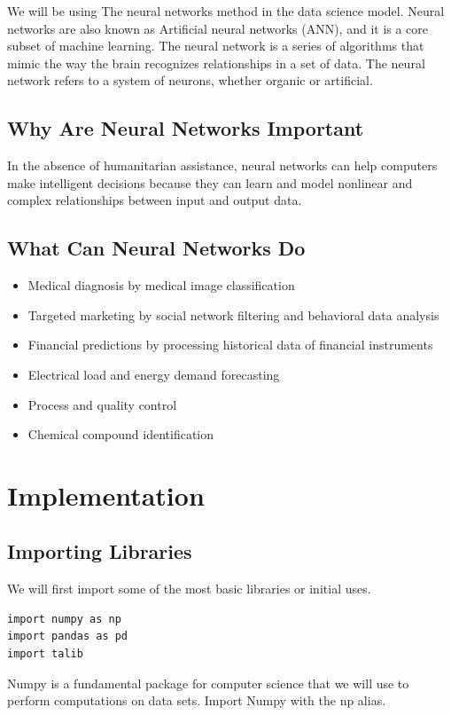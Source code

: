 \documentclass{article}
\begin{document}
We will be using The neural networks method in the data science model. Neural networks are also known as Artificial neural networks (ANN), and it is a core subset of machine learning. 
The neural network is a series of algorithms that mimic the way the brain recognizes relationships in a set of data. The neural network refers to a system of neurons, whether organic or artificial.

\subsection{Why Are Neural Networks Important}
In the absence of humanitarian assistance, neural networks can help computers make intelligent decisions because they can learn and model nonlinear and complex relationships between input and output data.

\subsection{What Can Neural Networks Do}
\begin{itemize}
    \item Medical diagnosis by medical image classification
    \item Targeted marketing by social network filtering and behavioral data analysis
    \item Financial predictions by processing historical data of financial instruments
    \item Electrical load and energy demand forecasting
    \item Process and quality control
    \item Chemical compound identification
\end{itemize}

\section{Implementation}
\subsection{Importing Libraries}
We will first import some of the most basic libraries or initial uses.
\begin{verbatim}
import numpy as np
import pandas as pd
import talib
\end{verbatim}
Numpy is a fundamental package for computer science that we will use to perform computations on data sets. Import Numpy with the np alias.
\end{document}
